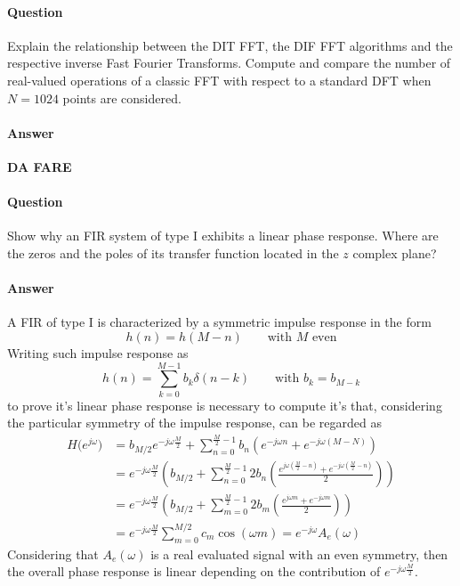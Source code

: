 \newquestion
	\paragraph{Question} Explain the relationship between the DIT FFT, the DIF FFT algorithms and the respective inverse Fast Fourier Transforms. Compute and compare the number of real-valued operations of a classic FFT with respect to a standard DFT when $N = 1024$ points are considered.
	
	\paragraph{Answer}	\textbf{DA FARE}
	
\newquestion
	\paragraph{Question} Show why an FIR system of type I exhibits a linear phase response. Where are the zeros and the poles	of its transfer function located in the $z$ complex plane?
	
	\paragraph{Answer} A FIR of type I is characterized by a symmetric impulse response in the form
	\[ h(n) = h(M-n) \qquad \textrm{with $M$ even} \]
	Writing such impulse response as
	\[ h(n) = \sum_{k=0}^{M-1} b_k \delta(n-k) 	\qquad \textrm{with } b_k = b_{M-k} \]
	to prove it's linear phase response is necessary to compute it's \dtft that, considering the particular symmetry of the impulse response, can be regarded as
	\begin{align*}
		H\big(e^{j\omega}\big) & = b_{M/2} e^{-j\omega \frac M2} + \sum_{n=0}^{\frac M2-1} b_n \left( e^{-j\omega n} + e^{-j\omega(M-N)} \right) \\
		& = e^{-j\omega \frac M 2} \left( b_{M/2} + \sum_{n=0}^{\frac M2-1} 2 b_n \left( \frac{e^{j\omega\left( \frac M 2 - n \right)} +e^{-j\omega\left( \frac M 2 - n \right)} }{2} \right) \right) \\
		& = e^{-j\omega \frac M 2} \left( b_{M/2} + \sum_{m=0}^{\frac M2-1} 2 b_m \left( \frac{e^{j\omega m } +e^{-j\omega m} }{2} \right) \right) \\
		& = e^{-j\omega \frac M 2} \sum_{m=0}^{M/2} c_m \cos(\omega m) = e^{-j\omega} A_e(\omega)
	\end{align*}
	Considering that $A_e(\omega)$ is a real evaluated signal with an even symmetry, then the overall phase response is linear depending on the contribution of $e^{-j\omega \frac M2}$.
	
